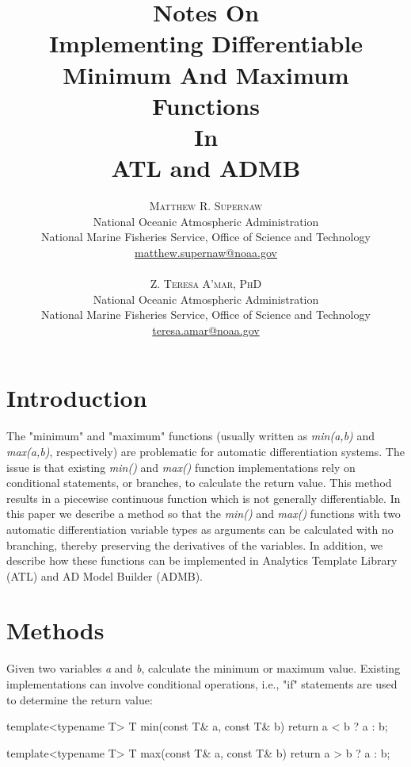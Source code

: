 \documentclass[oneside]{article}
\title{\vspace{-15mm}\fontsize{24pt}{24pt}\selectfont\textbf{Notes On \protect\\  Implementing Differentiable  \protect\\ Minimum And Maximum Functions \protect\\
In \protect\\
ATL and  ADMB}} %
\author{
\large
\textsc{Matthew R. Supernaw}\\[2mm] %
\normalsize National Oceanic Atmospheric Administration \\ %
\normalsize National Marine Fisheries Service, Office of Science and Technology\\ %
\normalsize \href{mailto:matthew.supernaw@noaa.gov}{matthew.supernaw@noaa.gov} \\ %
\\
\textsc{Z. Teresa A'mar, PhD}\\[2mm] %
\normalsize National Oceanic Atmospheric Administration \\ %
\normalsize National Marine Fisheries Service, Office of Science and Technology\\ %
\normalsize \href{mailto:teresa.amar@noaa.gov}{teresa.amar@noaa.gov} \\%
\vspace{-5mm}
}
\date{}
\begin{document}
\maketitle %

\thispagestyle{fancy} %


%
%
%


\newpage
\tableofcontents
\newpage

\section{Introduction}

The "minimum" and "maximum" functions (usually written as \textit{min(a,b)} and \textit{max(a,b)}, respectively) are problematic for automatic differentiation systems. The issue is that existing \textit{min()} and \textit{max()} function implementations rely on conditional statements, or branches, to calculate the return value. This method results in a piecewise continuous function which is not generally differentiable.  In this paper we describe a method so that the \textit{min()} and \textit{max()} functions with two automatic differentiation variable types as arguments can be calculated with no branching, thereby preserving the derivatives of the variables. In addition, we describe how these functions can be implemented in Analytics Template Library (ATL) and AD Model Builder (ADMB).


\section{Methods}

Given two variables \textit{a} and \textit{b}, calculate the minimum or maximum value. Existing implementations can involve conditional operations, i.e., "if" statements are used to determine the return value:

\begin{cppsource}
template<typename T>
T min(const T& a, const T& b){
   return a < b ? a : b;
}

template<typename T>
T max(const T& a, const T& b){
   return a > b ? a : b;
}

\end{cppsource}
\end{document}
